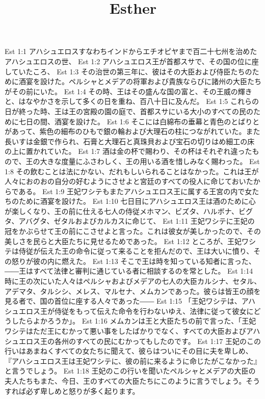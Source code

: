 

\title{Esther}

Est 1:1  アハシュエロスすなわちインドからエチオピヤまで百二十七州を治めたアハシュエロスの世、
Est 1:2  アハシュエロス王が首都スサで、その国の位に座していたころ、
Est 1:3  その治世の第三年に、彼はその大臣および侍臣たちのために酒宴を設けた。ペルシャとメデアの将軍および貴族ならびに諸州の大臣たちがその前にいた。
Est 1:4  その時、王はその盛んな国の富と、その王威の輝きと、はなやかさを示して多くの日を重ね、百八十日に及んだ。
Est 1:5  これらの日が終った時、王は王の宮殿の園の庭で、首都スサにいる大小のすべての民のために七日の間、酒宴を設けた。
Est 1:6  そこには白綿布の垂幕と青色のとばりとがあって、紫色の細布のひもで銀の輪および大理石の柱につながれていた。また長いすは金銀で作られ、石膏と大理石と真珠貝および宝石の切りはめ細工の床の上に置かれていた。
Est 1:7  酒は金の杯で賜わり、その杯はそれぞれ違ったもので、王の大きな度量にふさわしく、王の用いる酒を惜しみなく賜わった。
Est 1:8  その飲むことは法にかない、だれもしいられることはなかった。これは王が人々におのおの自分の好むようにさせよと宮廷のすべての役人に命じておいたからである。
Est 1:9  王妃ワシテもまたアハシュエロス王に属する王宮の内で女たちのために酒宴を設けた。
Est 1:10  七日目にアハシュエロス王は酒のために心が楽しくなり、王の前に仕える七人の侍従メホマン、ビズタ、ハルボナ、ビグタ、アバグタ、ゼタルおよびカルカスに命じて、
Est 1:11  王妃ワシテに王妃の冠をかぶらせて王の前にこさせよと言った。これは彼女が美しかったので、その美しさを民らと大臣たちに見せるためであった。
Est 1:12  ところが、王妃ワシテは侍従が伝えた王の命令に従って来ることを拒んだので、王は大いに憤り、その怒りが彼の内に燃えた。
Est 1:13  そこで王は時を知っている知者に言った、――王はすべて法律と審判に通じている者に相談するのを常とした。
Est 1:14  時に王の次にいた人々はペルシャおよびメデアの七人の大臣カルシナ、セタル、アデマタ、タルシシ、メレス、マルセナ、メムカンであった。彼らは皆王の顔を見る者で、国の首位に座する人々であった――
Est 1:15  「王妃ワシテは、アハシュエロス王が侍従をもって伝えた命令を行わないゆえ、法律に従って彼女にどうしたらよかろうか」。
Est 1:16  メムカンは王と大臣たちの前で言った、「王妃ワシテはただ王にむかって悪い事をしたばかりでなく、すべての大臣およびアハシュエロス王の各州のすべての民にむかってもしたのです。
Est 1:17  王妃のこの行いはあまねくすべての女たちに聞えて、彼らはついにその目に夫を卑しめ、『アハシュエロス王は王妃ワシテに、彼の前に来るように命じたがこなかった』と言うでしょう。
Est 1:18  王妃のこの行いを聞いたペルシャとメデアの大臣の夫人たちもまた、今日、王のすべての大臣たちにこのように言うでしょう。そうすれば必ず卑しめと怒りが多く起ります。
